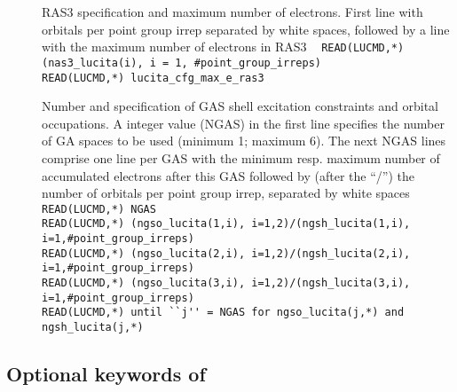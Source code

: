 \begin{description}
\item[] RAS3 specification and maximum number of electrons. 
First line with orbitals per point group irrep separated by white spaces, 
followed by a line with the maximum number of electrons in RAS3 \verb| |\newline
\verb|READ(LUCMD,*) (nas3_lucita(i), i = 1, #point_group_irreps) |\\
\verb|READ(LUCMD,*) lucita_cfg_max_e_ras3 |

\newpage
{}

\item[] Number and specification of GAS shell excitation constraints and orbital occupations. 
A integer value (NGAS) in the first line specifies the number of GA spaces to be used (minimum 1; maximum 6). 
The next NGAS lines comprise one line per GAS with the minimum resp. maximum number of 
accumulated electrons after this GAS followed by (after the ``/'') the number 
of orbitals per point group irrep, separated by white spaces \verb| |\newline
\verb|READ(LUCMD,*) NGAS |\\
\verb|READ(LUCMD,*) (ngso_lucita(1,i), i=1,2)/(ngsh_lucita(1,i), i=1,#point_group_irreps) |\\
\verb|READ(LUCMD,*) (ngso_lucita(2,i), i=1,2)/(ngsh_lucita(2,i), i=1,#point_group_irreps) |\\
\verb|READ(LUCMD,*) (ngso_lucita(3,i), i=1,2)/(ngsh_lucita(3,i), i=1,#point_group_irreps) |\\
\verb|READ(LUCMD,*) until ``j'' = NGAS for ngso_lucita(j,*) and ngsh_lucita(j,*) |

\end{description}
\subsection{Optional keywords of }\label{sec:lucita-inp-opt}

